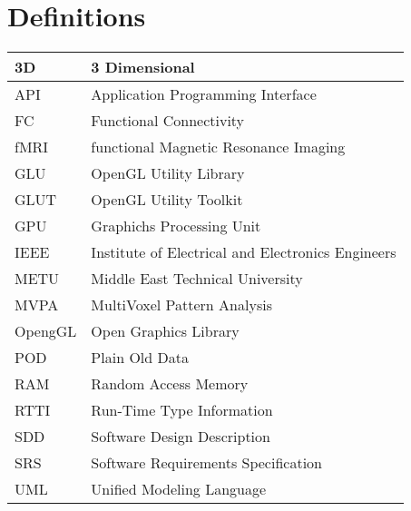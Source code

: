 
\newpage

\section{Definitions}
\paragraph{}
	\begin{tabular}{|p{3cm}|p{12cm}|}
		\hline 
			3D & 3 Dimensional \\
        \hline
			API & Application Programming Interface \\
		\hline
			FC & Functional Connectivity \\
		\hline
			fMRI & functional Magnetic Resonance Imaging \\
		\hline
			GLU & OpenGL Utility Library \\
		\hline
			GLUT & OpenGL Utility Toolkit \\
		\hline
			GPU &  Graphichs Processing Unit \\   
		\hline
			IEEE & Institute of Electrical and Electronics Engineers \\
		\hline
			METU & Middle East Technical University \\
		\hline
			MVPA & MultiVoxel Pattern Analysis \\
		\hline
			OpengGL & Open Graphics Library \\
		\hline
			POD & Plain Old Data \\
		\hline
			RAM & Random Access Memory \\
		\hline
			RTTI & Run-Time Type Information \\
        \hline
			SDD & Software Design Description \\
        \hline
			SRS & Software Requirements Specification \\
		\hline
			UML & Unified Modeling Language \\
		\hline
	\end{tabular}